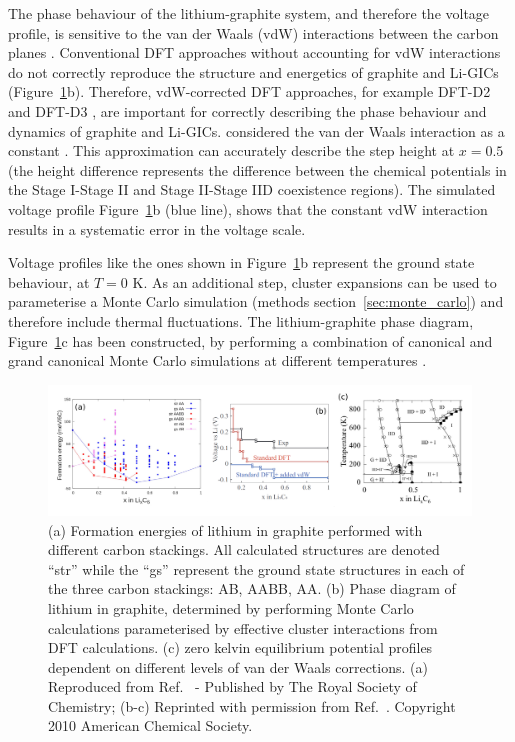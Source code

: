 \documentclass[../main.tex]{subfiles}
\begin{document}
The phase behaviour of the lithium-graphite system, and therefore the voltage profile, is sensitive to the van der Waals (vdW) interactions between the carbon planes \cite{thinius2014theoretical, Hakim,persson2010}.
Conventional DFT approaches without accounting for vdW interactions do not correctly reproduce the structure and energetics of graphite and Li-GICs \cite{thinius2014theoretical, Hakim,persson2010} (Figure~\ref{fig:persson_graphitephases}b). Therefore, vdW-corrected DFT approaches, for example DFT-D2 \cite{Grimme-1} and DFT-D3 \cite{Grimme-3}, are important for correctly describing the phase behaviour and dynamics of graphite and Li-GICs. \citeauthor{persson2010} considered the van der Waals interaction as a constant \cite{persson2010}. This approximation can accurately describe the step height at $x=0.5$ (the height difference represents the difference between the chemical potentials in the Stage I-Stage II and Stage II-Stage IID coexistence regions). The simulated voltage profile Figure~\ref{fig:persson_graphitephases}b (blue line), shows that the constant vdW interaction results in a systematic error in the voltage scale.

Voltage profiles like the ones shown in Figure~\ref{fig:persson_graphitephases}b represent the ground state behaviour, at $T = 0$ K. As an additional step, cluster expansions can be used to parameterise a Monte Carlo simulation (methods section~\ref{sec:monte_carlo}) and therefore include thermal fluctuations. The lithium-graphite phase diagram, Figure~\ref{fig:persson_graphitephases}c has been constructed, by performing a combination of canonical and grand canonical Monte Carlo simulations at different temperatures \cite{persson2010}. 

\begin{figure}
    \centering
    \includegraphics[scale=0.45]{figures/cluster_expansions_persson.png}
    \caption{(a) Formation energies of lithium in graphite performed with different carbon stackings. All calculated structures are denoted ``str'' while the ``gs'' represent the ground state structures in each of the three carbon stackings: AB, AABB, AA. (b) Phase diagram of lithium in graphite, determined by performing Monte Carlo calculations parameterised by effective cluster interactions from DFT calculations. (c) zero kelvin equilibrium potential profiles dependent on different levels of van der Waals corrections. (a) Reproduced from Ref.~ - Published by The Royal Society of Chemistry; (b-c) Reprinted with permission from Ref.~. Copyright 2010 American Chemical Society.}
    \label{fig:persson_graphitephases}
\end{figure}
\end{document}

